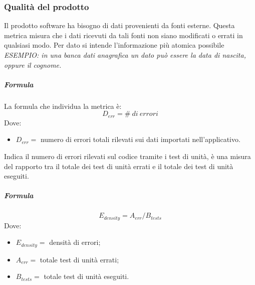 		\subsubsection{Qualità del prodotto}
        Il prodotto software ha bisogno di dati provenienti da fonti esterne. Questa 
        metrica misura che i dati ricevuti da tali fonti non siano modificati o errati 
        in qualsiasi modo. Per dato si intende l'informazione più atomica possibile
        \textit{ESEMPIO: in una banca dati anagrafica un dato può essere la data di 
        nascita, oppure il cognome.}
        \subparagraph{Formula}
        La formula che individua la metrica è:
        \begin{displaymath}
          D_{err} = \#\ di\ errori
        \end{displaymath}
        Dove:
        \begin{itemize}
        \item[]$D_{err} =$  numero di errori totali rilevati sui dati importati 
        nell'applicativo.
        \end{itemize}
        Indica il numero di errori rilevati sul codice tramite i test di unità, è una 
        misura del rapporto tra il totale dei test di unità errati e il totale dei test 
        di unità eseguiti.
        \subparagraph{Formula}
        \begin{displaymath}
          E_{density} = A_{err}/B_{tests}
        \end{displaymath}
        Dove:
        \begin{itemize}
          \item[] $E_{density} =$ densità di errori;
          \item[] $A_{err} =$ totale test di unità errati;  
          \item[] $B_{tests} =$ totale test di unità eseguiti.
        \end{itemize}
        

